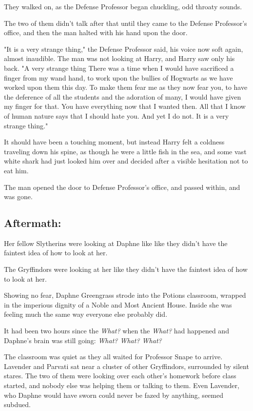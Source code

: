 They walked on, as the Defense Professor began chuckling, odd throaty sounds.

The two of them didn't talk after that until they came to the Defense
Professor's office, and then the man halted with his hand upon the door.

"It is a very strange thing," the Defense Professor said, his voice now soft
again, almost inaudible. The man was not looking at Harry, and Harry saw only
his back. "A very strange thing{\el} There was a time when I would have
sacrificed a finger from my wand hand, to work upon the bullies of Hogwarts as
we have worked upon them this day. To make them fear me as they now fear you,
to have the deference of all the students and the adoration of many, I would
have given my finger for that. You have everything now that I wanted then. All
that I know of human nature says that I should hate you. And yet I do not. It
is a very strange thing."

It should have been a touching moment, but instead Harry felt a coldness
traveling down his spine, as though he were a little fish in the sea, and some
vast white shark had just looked him over and decided after a visible
hesitation not to eat him.

The man opened the door to Defense Professor's office, and passed within, and
was gone.
\sbreak
\subsection{Aftermath:}

Her fellow Slytherins were looking at Daphne like{\el} like they didn't have
the faintest idea of how to look at her.

The Gryffindors were looking at her like they didn't have the faintest idea of
how to look at her.

Showing no fear, Daphne Greengrass strode into the Potions classroom, wrapped
in the imperious dignity of a Noble and Most Ancient House. Inside she was
feeling much the same way everyone else probably did.

It had been two hours since the \emph{What?} when the \emph{What?} had happened
and Daphne's brain was still going: \emph{What? What? What?}

The classroom was quiet as they all waited for Professor Snape to arrive.
Lavender and Parvati sat near a cluster of other Gryffindors, surrounded by
silent stares. The two of them were looking over each other's homework before
class started, and nobody else was helping them or talking to them. Even
Lavender, who Daphne would have sworn could never be fazed by anything, seemed
subdued.

